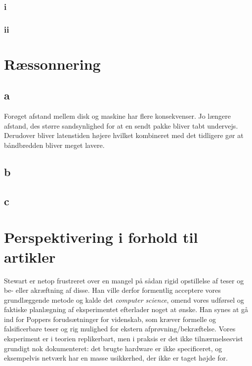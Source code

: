 \documentclass{article}
\begin{document}
\subsubsection{i}

\subsubsection{ii}

\section{Ræssonnering}

\subsection{a}
Forøget afstand mellem disk og maskine har flere konsekvenser. Jo længere afstand, des større sandsynlighed for at en sendt pakke bliver tabt undervejs. Derudover bliver latenstiden højere hvilket kombineret med det tidligere gør at båndbredden bliver meget lavere.

\subsection{b}

\subsection{c}

\section{Perspektivering i forhold til artikler}

Stewart er netop frustreret over en mangel på sådan rigid opstillelse af teser og be- eller akræftning af disse. Han ville derfor formentlig acceptere vores grundlæggende metode og kalde det \textit{computer science}, omend vores udførsel og faktiske planlægning af eksperimentet efterlader noget at ønske. Han synes at gå ind for Poppers forudsætninger for videnskab, som kræver formelle og falsificerbare teser og rig mulighed for ekstern afprøvning/bekræftelse. Vores eksperiment er i teorien replikerbart, men i praksis er det ikke tilnærmelsesvist grundigt nok dokumenteret: det brugte hardware er ikke specificeret, og eksempelvis netværk har en masse usikkerhed, der ikke er taget højde for.   
\end{document}
